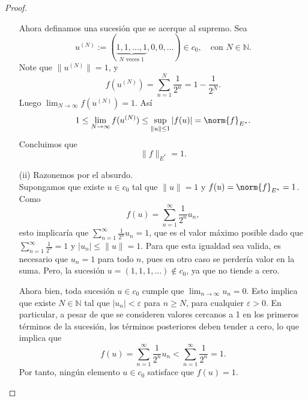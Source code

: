 \begin{proof}
\begin{itemize}
    Ahora definamos una sucesión que se acerque al supremo. Sea
    $$u^{(N)} := (\underbrace{1, 1, \dots, 1}_{N \text{ veces }1}, 0, 0, \dots) \in c_0, \quad \text{con }  N \in \mathbb{N}.$$
    Note que $\|u^{(N)}\| = 1$, y
    $$f(u^{(N)}) = \sum_{n=1}^N \frac{1}{2^n} = 1 - \frac{1}{2^N}.$$
    Luego $\lim_{N \to \infty} f(u^{(N)}) = 1.$ Así
    $$1\leq \lim_{N \to \infty} f(u^{(N)}) \leq \sup_{\|u\| \leq 1} |f(u)| = \norm{f}_{E^*}.$$
    Concluimos que
    \[
    \|f\|_{E^*} = 1.
    \]
    \item[(ii)] Razonemos por el absurdo.\\
    Supongamos que existe $u \in c_0$ tal que $\|u\| = 1$ y $f(u) = \norm{f}_{E^*}= 1$. Como
    $$f(u) = \sum_{n=1}^\infty \frac{1}{2^n} u_n,$$
    esto implicaría que $\displaystyle\sum_{n=1}^\infty \frac{1}{2^n} u_n = 1$, que es el valor máximo posible dado que $\displaystyle\sum_{n=1}^\infty \frac{1}{2^n} = 1$ y $|u_n| \leq \|u\| = 1$. Para que esta igualdad sea valida, es necesario que $u_n = 1$ para todo $n$, pues en otro caso se perdería valor en la suma. Pero, la sucesión $u = (1,1,1,\dots) \notin c_0$, ya que no tiende a cero.
    
    Ahora bien, toda sucesión $u \in c_0$ cumple que $\displaystyle\lim_{n \to \infty} u_n = 0$. Esto implica que existe $N \in \mathbb{N}$ tal que $|u_n| < \varepsilon$ para $n \geq N$, para cualquier $\varepsilon > 0$. En particular, a pesar de que se consideren valores cercanos a 1 en los primeros términos de la sucesión, los términos posteriores deben tender a cero, lo que implica que
    $$f(u) = \sum_{n=1}^\infty \frac{1}{2^n} u_n < \sum_{n=1}^\infty \frac{1}{2^n} = 1.$$
    Por tanto, ningún elemento $u \in c_0$ satisface que $f(u) = 1$.
\end{itemize}
\end{proof}